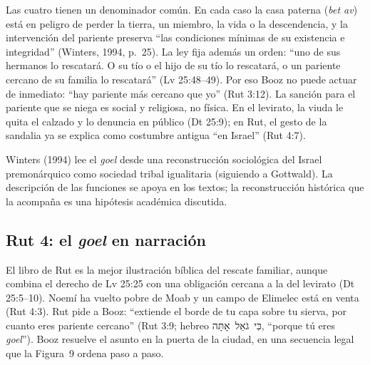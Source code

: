 \documentclass[11pt,letterpaper]{article}
\newcommand{\heb}[1]{\mbox{\foreignlanguage{hebrew}{#1}}}
\begin{document}
Las cuatro tienen un denominador común. En cada caso la casa paterna (\emph{bet av}) está en peligro de perder la tierra, un miembro, la vida o la descendencia, y la intervención del pariente preserva ``las condiciones mínimas de su existencia e integridad'' (Winters, 1994, p.~25). La ley fija además un orden: ``uno de sus hermanos lo rescatará. O su tío o el hijo de su tío lo rescatará, o un pariente cercano de su familia lo rescatará'' (Lv 25:48--49). Por eso Booz no puede actuar de inmediato: ``hay pariente más cercano que yo'' (Rut 3:12). La sanción para el pariente que se niega es social y religiosa, no física. En el levirato, la viuda le quita el calzado y lo denuncia en público (Dt 25:9); en Rut, el gesto de la sandalia ya se explica como costumbre antigua ``en Israel'' (Rut 4:7).

\begin{nota}[Precisión]
Winters (1994) lee el \emph{goel} desde una reconstrucción sociológica del Israel premonárquico como sociedad tribal igualitaria (siguiendo a Gottwald). La descripción de las funciones se apoya en los textos; la reconstrucción histórica que la acompaña es una hipótesis académica discutida.
\end{nota}

\subsection{Rut 4: el \emph{goel} en narración}
El libro de Rut es la mejor ilustración bíblica del rescate familiar, aunque combina el derecho de Lv 25:25 con una obligación cercana a la del levirato (Dt 25:5--10). Noemí ha vuelto pobre de Moab y un campo de Elimelec está en venta (Rut 4:3). Rut pide a Booz: ``extiende el borde de tu capa sobre tu sierva, por cuanto eres pariente cercano'' (Rut 3:9; hebreo \heb{כִּי גֹאֵל אָתָּה}, ``porque tú eres \emph{goel}''). Booz resuelve el asunto en la puerta de la ciudad, en una secuencia legal que la Figura~9 ordena paso a paso.
\end{document}
